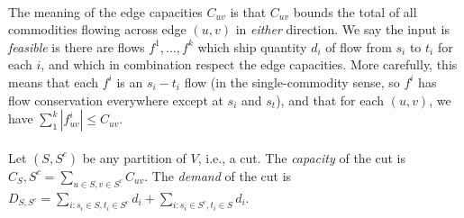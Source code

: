 \documentclass{article}
\begin{document}
\paragraph{}
The meaning of the edge capacities \(C_{uv}\) is that \(C_{uv}\) bounds the total of all
commodities flowing across edge \((u,v)\) in \textit{either} direction. We say the input
is \textit{feasible} is there are flows \(f^1 , \ldots, f^k\) which ship quantity \(d_i\)
of flow from \(s_i\) to \(t_i\) for each \(i\), and which in combination respect the edge
capacities. More carefully, this means that each \(f^i\) is an \(s_i - t_i\) flow (in the
single-commodity sense, so \(f^i\) has flow conservation everywhere except at \(s_i\) and
\(s_t\)), and that for each \((u,v)\), we have \(\sum^{k}_{1}|f^{i}_{uv}| \leq C_{uv}\).

\paragraph{}
Let \((S, S^c)\) be any partition of \(V\), i.e., a cut. The \textit{capacity} of the cut
is \(C_S,S^c = \sum_{u\in S, v \in S^c} C_{uv}\).
The \textit{demand} of the cut is \(D_{S,S^c} = \sum_{i: s_i \in S, t_i \in S^c} d_i +
\sum_{i: s_i \in S^c , t_i \in S} d_i\).
\end{document}
